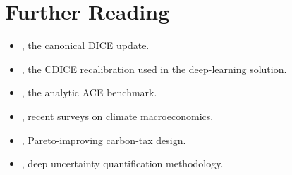 \documentclass[11pt,a4paper]{report}
\begin{document}
\section*{Further Reading}
\begin{itemize}[itemsep=2pt]
\item \citet{nordhausRevisitingSocialCost2017}, the canonical DICE update.
\item \citet{Folini_2021}, the CDICE recalibration used in the deep-learning solution.
\item \citet{traeger2018ace}, the analytic ACE benchmark.
\item \citet{DIETZ20241, fernandezvillaverde2025climate, vanderploegrezai2026climate}, recent surveys on climate macroeconomics.
\item \citet{kotlikoff2021making, kubler2025using}, Pareto-improving carbon-tax design.
\item \citet{friedlDeep2023}, deep uncertainty quantification methodology.
\end{itemize}
\end{document}
